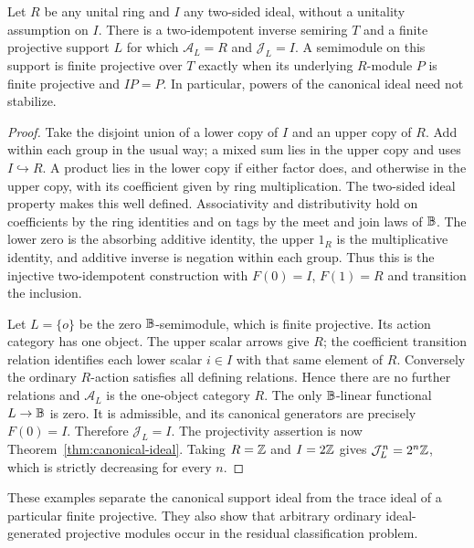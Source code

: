 \begin{proposition}
\label{prop:canonical-arbitrary-ideal}
Let $R$ be any unital ring and $I$ any two-sided ideal, without a
unitality assumption on $I$. There is a two-idempotent inverse semiring
$T$ and a finite projective support $L$ for which
$\mathcal A_L=R$ and $\mathcal J_L=I$.
A semimodule on this support is finite projective over $T$ exactly when
its underlying $R$-module $P$ is finite projective and $IP=P$.
In particular, powers of the canonical ideal need not stabilize.
\end{proposition}
\begin{proof}
Take the disjoint union of a lower copy of $I$ and an upper copy of $R$.
Add within each group in the usual way; a mixed sum lies in the upper
copy and uses $I\hookrightarrow R$. A product lies in the lower copy
if either factor does, and otherwise in the upper copy, with its
coefficient given by ring multiplication. The two-sided ideal property
makes this well defined. Associativity and distributivity hold on
coefficients by the ring identities and on tags by the meet and join
laws of $\mathbb B$. The lower zero is the absorbing additive identity, the
upper $1_R$ is the multiplicative identity, and additive inverse is
negation within each group. Thus this is the injective two-idempotent
construction with $F(0)=I$, $F(1)=R$ and transition the inclusion.

Let $L=\{o\}$ be the zero $\mathbb B$-semimodule, which is finite projective.
Its action category has one object. The upper scalar arrows give $R$;
the coefficient transition relation identifies each lower scalar
$i\in I$ with that same element of $R$. Conversely the ordinary
$R$-action satisfies all defining relations. Hence there are no further
relations and $\mathcal A_L$ is the one-object category $R$.
The only $\mathbb B$-linear functional $L\to\mathbb B$ is zero. It is admissible,
and its canonical generators are precisely $F(0)=I$. Therefore
$\mathcal J_L=I$. The projectivity assertion is now
Theorem~\ref{thm:canonical-ideal}. Taking $R=\mathbb Z$ and $I=2\mathbb Z$ gives
$\mathcal J_L^n=2^n\mathbb Z$, which is strictly decreasing for every $n$.
\end{proof}
These examples separate the canonical support ideal from the trace
ideal of a particular finite projective. They also show that arbitrary
ordinary ideal-generated projective modules occur in the residual
classification problem.
